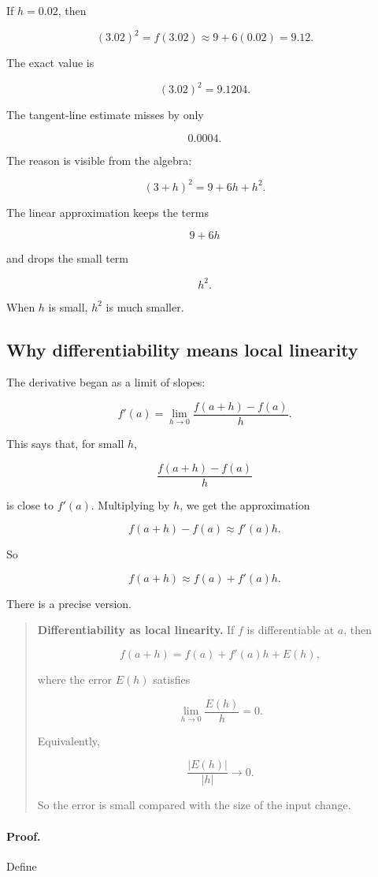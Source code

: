 If \(h=0.02\), then

\[
(3.02)^2=f(3.02)\approx 9+6(0.02)=9.12.
\]

The exact value is

\[
(3.02)^2=9.1204.
\]

The tangent-line estimate misses by only

\[
0.0004.
\]

The reason is visible from the algebra:

\[
(3+h)^2=9+6h+h^2.
\]

The linear approximation keeps the terms

\[
9+6h
\]

and drops the small term

\[
h^2.
\]

When \(h\) is small, \(h^2\) is much smaller.

\subsection{Why differentiability means local linearity}
\label{subsec:differentiability-local-linearity}

The derivative began as a limit of slopes:

\[
f'(a)=\lim_{h\to0}\frac{f(a+h)-f(a)}{h}.
\]

This says that, for small \(h\),

\[
\frac{f(a+h)-f(a)}{h}
\]

is close to \(f'(a)\).  Multiplying by \(h\), we get the approximation

\[
f(a+h)-f(a)\approx f'(a)h.
\]

So

\[
f(a+h)\approx f(a)+f'(a)h.
\]

There is a precise version.

\begin{quote}
\textbf{Differentiability as local linearity.}
If \(f\) is differentiable at \(a\), then

\[
f(a+h)=f(a)+f'(a)h+E(h),
\]

where the error \(E(h)\) satisfies

\[
\lim_{h\to0}\frac{E(h)}{h}=0.
\]

Equivalently,

\[
\frac{|E(h)|}{|h|}\to0.
\]

So the error is small compared with the size of the input change.
\end{quote}

\paragraph{Proof.}
Define

